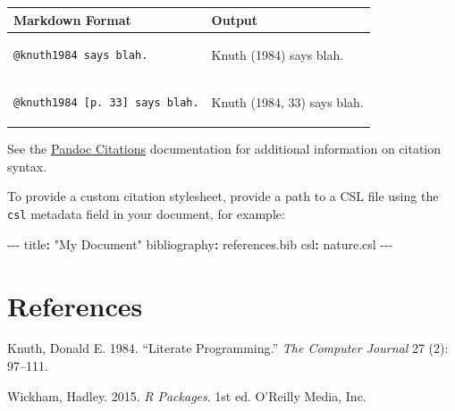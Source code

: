 \documentclass[
]{interact}
\newenvironment{Shaded}{\begin{snugshade}}{\end{snugshade}}
\newcommand{\AttributeTok}[1]{\textcolor[rgb]{0.40,0.45,0.13}{#1}}
\newcommand{\FunctionTok}[1]{\textcolor[rgb]{0.28,0.35,0.67}{#1}}
\newcommand{\KeywordTok}[1]{\textcolor[rgb]{0.00,0.23,0.31}{\textbf{#1}}}
\newcommand{\PreprocessorTok}[1]{\textcolor[rgb]{0.68,0.00,0.00}{#1}}
\newcommand{\StringTok}[1]{\textcolor[rgb]{0.13,0.47,0.30}{#1}}
\newcounter{none} %
\newlength{\cslhangindent}
\newenvironment{CSLReferences}[2] %
 {\begin{list}{}{%
  \setlength{\itemindent}{0pt}
  \setlength{\leftmargin}{0pt}
  \setlength{\parsep}{0pt}
  \ifodd #1
   \setlength{\leftmargin}{\cslhangindent}
   \setlength{\itemindent}{-1\cslhangindent}
  \fi
  \setlength{\itemsep}{#2\baselineskip}}}
 {\end{list}}
\begin{document}
{\def\LTcaptype{none} %
\begin{longtable}[]{@{}
  >{\raggedright\arraybackslash}p{}
  >{\raggedright\arraybackslash}p{}@{}}
\toprule\noalign{}
\begin{minipage}[b]{\linewidth}\raggedright
Markdown Format
\end{minipage} & \begin{minipage}[b]{\linewidth}\raggedright
Output
\end{minipage} \\
\midrule\noalign{}
\endhead
\bottomrule\noalign{}
\endlastfoot
\begin{minipage}[t]{\linewidth}\raggedright
\begin{verbatim}
@knuth1984 says blah.
\end{verbatim}
\end{minipage} & Knuth (1984) says blah. \\
\begin{minipage}[t]{\linewidth}\raggedright
\begin{verbatim}
@knuth1984 [p. 33] says blah.
\end{verbatim}
\end{minipage} & Knuth (1984, 33) says blah. \\
\end{longtable}
}

See the \href{https://pandoc.org/MANUAL.html\#citations}{Pandoc
Citations} documentation for additional information on citation syntax.

To provide a custom citation stylesheet, provide a path to a CSL file
using the \texttt{csl} metadata field in your document, for example:

\begin{Shaded}
\begin{Highlighting}[]
\PreprocessorTok{{-}{-}{-}}
\FunctionTok{title}\KeywordTok{:}\AttributeTok{ }\StringTok{"My Document"}
\FunctionTok{bibliography}\KeywordTok{:}\AttributeTok{ references.bib}
\FunctionTok{csl}\KeywordTok{:}\AttributeTok{ nature.csl}
\PreprocessorTok{{-}{-}{-}}
\end{Highlighting}
\end{Shaded}

\newpage{}

\section*{References}\label{references}

\protect{}\label{refs}
\begin{CSLReferences}{1}{1}
Knuth, Donald E. 1984. {``Literate Programming.''} \emph{The Computer
Journal} 27 (2): 97--111.

Wickham, Hadley. 2015. \emph{R Packages}. 1st ed. O'Reilly Media, Inc.

\end{CSLReferences}
\end{document}
